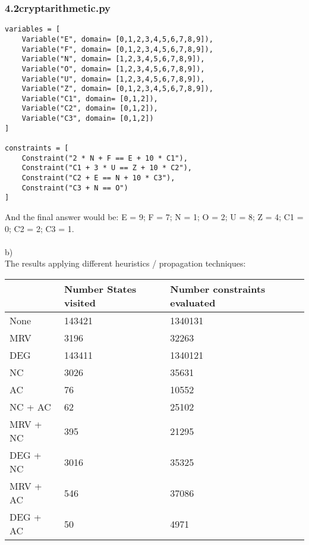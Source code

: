 \documentclass{article}
\begin{document}
\subsubsection*{4.2cryptarithmetic.py}
\begin{lstlisting} 
variables = [
    Variable("E", domain= [0,1,2,3,4,5,6,7,8,9]),
    Variable("F", domain= [0,1,2,3,4,5,6,7,8,9]),
    Variable("N", domain= [1,2,3,4,5,6,7,8,9]),
    Variable("O", domain= [1,2,3,4,5,6,7,8,9]),
    Variable("U", domain= [1,2,3,4,5,6,7,8,9]),
    Variable("Z", domain= [0,1,2,3,4,5,6,7,8,9]),
    Variable("C1", domain= [0,1,2]),
    Variable("C2", domain= [0,1,2]),
    Variable("C3", domain= [0,1,2])
]

constraints = [
    Constraint("2 * N + F == E + 10 * C1"),
    Constraint("C1 + 3 * U == Z + 10 * C2"),
    Constraint("C2 + E == N + 10 * C3"),
    Constraint("C3 + N == O")
]
\end{lstlisting}
And the final answer would be:
E = 9; F = 7; N = 1; O = 2; U = 8; Z = 4; C1 = 0; C2 = 2; C3 = 1.\\
\\
b) 
\\
The results applying different heuristics / propagation techniques:
\begin{center}
\begin{tabular}{|l|l|l|}
\hline
         & Number States visited & Number constraints evaluated \\ \hline
None     & 143421                & 1340131                      \\ \hline
MRV      & 3196                  & 32263                        \\ \hline
DEG      & 143411                & 1340121                      \\ \hline
NC       & 3026                  & 35631                        \\ \hline
AC       & 76                    & 10552                        \\ \hline
NC + AC  & 62                    & 25102                        \\ \hline
MRV + NC & 395                   & 21295                        \\ \hline
DEG + NC & 3016                  & 35325                        \\ \hline
MRV + AC & 546                   & 37086                        \\ \hline
DEG + AC & 50                    & 4971                         \\ \hline
\end{tabular}
\end{center}
\end{document}
